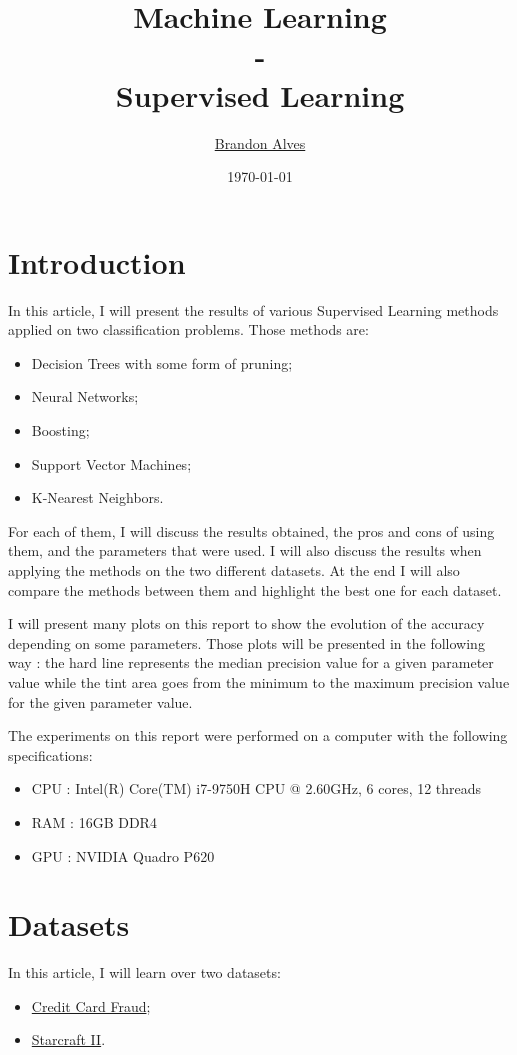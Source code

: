 \documentclass[10pt]{article}
\title{
	Machine Learning
	\\-\\
	Supervised Learning
}
\author{
	\href{mailto:brandon.alves@gatech.edu}{Brandon Alves}
}
\date{\today}
\begin{document}
	\maketitle
	\tableofcontents
	\listoffigures
	\newpage
	\section{Introduction}
		In this article, I will present the results of various Supervised Learning methods applied on two classification problems. Those methods are:
		\begin{itemize}
			\item Decision Trees with some form of pruning;
			\item Neural Networks;
			\item Boosting;
			\item Support Vector Machines;
			\item K-Nearest Neighbors.
		\end{itemize}
		For each of them, I will discuss the results obtained, the pros and cons of using them, and the parameters that were used. I will also discuss the results when applying the methods on the two different datasets. At the end I will also compare the methods between them and highlight the best one for each dataset.

		I will present many plots on this report to show the evolution of the accuracy depending on some parameters. Those plots will be presented in the following way : the hard line represents the median precision value for a given parameter value while the tint area goes from the minimum to the maximum precision value for the given parameter value.

		The experiments on this report were performed on a computer with the following specifications:
		\begin{itemize}
			\item CPU : Intel(R) Core(TM) i7-9750H CPU @ 2.60GHz, 6 cores, 12 threads
			\item RAM : 16GB DDR4
			\item GPU : NVIDIA Quadro P620
		\end{itemize}
	\section{Datasets}
		In this article, I will learn over two datasets:
		\begin{itemize}
			\item \href{https://www.kaggle.com/code/sngkadam/credit-card-fraud-detection/data}{Credit Card Fraud};
			\item \href{https://www.kaggle.com/c/the-insa-starcraft-2-player-prediction-challenge/data}{Starcraft II}.
		\end{itemize}
\end{document}
